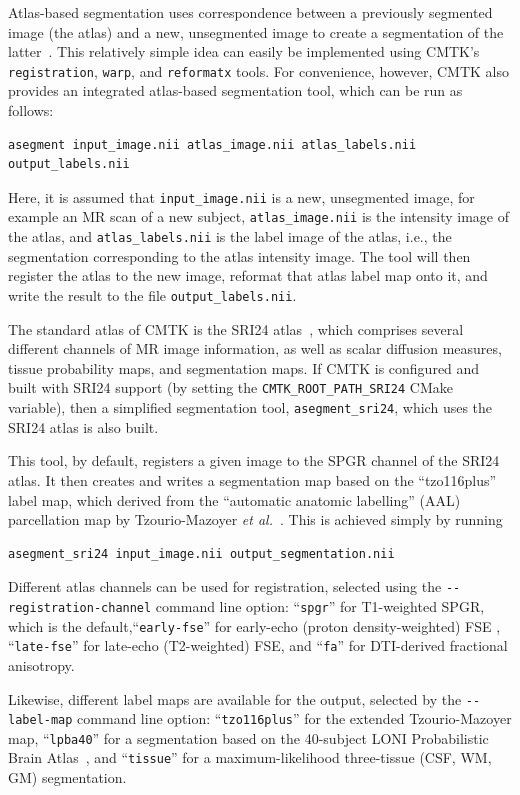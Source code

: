 \documentclass{InsightArticle}
\begin{document}
Atlas-based segmentation uses correspondence between a previously segmented
image (the atlas) and a new, unsegmented image to create a segmentation of the
latter~\cite{MillChriAmit:1993}. This relatively simple idea can easily be
implemented using CMTK's \verb|registration|, \verb|warp|, and
\verb|reformatx| tools. For convenience, however, CMTK also provides an
integrated atlas-based segmentation tool, which can be run as follows:
\begin{verbatim}
asegment input_image.nii atlas_image.nii atlas_labels.nii output_labels.nii
\end{verbatim}
Here, it is assumed that \verb|input_image.nii| is a new, unsegmented image,
for example an MR scan of a new subject, \verb|atlas_image.nii| is the
intensity image of the atlas, and \verb|atlas_labels.nii| is the label image
of the atlas, i.e., the segmentation corresponding to the atlas intensity
image. The tool will then register the atlas to the new image, reformat that
atlas label map onto it, and write the result to the file
\verb|output_labels.nii|.

The standard atlas of CMTK is the SRI24
atlas~\cite{RohlZahrSull:2008,RohlZahrSull:2010}, which comprises several
different channels of MR image information, as well as scalar diffusion
measures, tissue probability maps, and segmentation maps. If CMTK is
configured and built with SRI24 support (by setting the
\verb|CMTK_ROOT_PATH_SRI24| CMake variable), then a simplified segmentation
tool, \verb|asegment_sri24|, which uses the SRI24 atlas is also built.

This tool, by default, registers a given image to the SPGR channel of the
SRI24 atlas. It then creates and writes a segmentation map based on the
``tzo116plus'' label map, which derived from the ``automatic anatomic
labelling'' (AAL) parcellation map by Tzourio-Mazoyer {\em et
al.\/}~\cite{TzouLandPapa:2002}. This is achieved simply by running
\begin{verbatim}
asegment_sri24 input_image.nii output_segmentation.nii
\end{verbatim} 
Different atlas channels can be used for registration, selected
using the \verb|--registration-channel| command line option: ``\verb|spgr|''
for T1-weighted SPGR, which is the default,``\verb|early-fse|'' for early-echo
(proton density-weighted) FSE , ``\verb|late-fse|'' for late-echo
(T2-weighted) FSE, and ``\verb|fa|'' for DTI-derived fractional anisotropy.

Likewise, different label maps are available for the output, selected by the
\verb|--label-map| command line option: ``\verb|tzo116plus|'' for the extended
Tzourio-Mazoyer map, ``\verb|lpba40|'' for a segmentation based on the
40-subject LONI Probabilistic Brain Atlas~\cite{ShatMirzAdis:2008}, and
``\verb|tissue|'' for a maximum-likelihood three-tissue (CSF, WM, GM)
segmentation.
\end{document}

